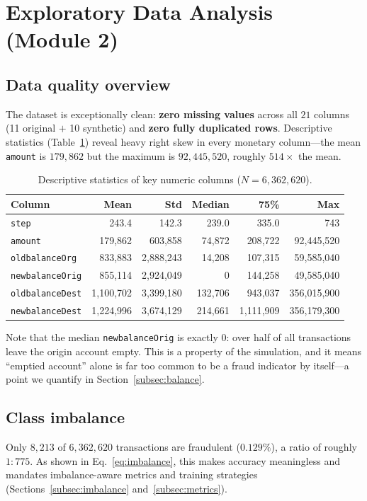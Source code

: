 \documentclass{article}
\begin{document}
\section{Exploratory Data Analysis (Module 2)}
\label{sec:eda}

\subsection{Data quality overview}
The dataset is exceptionally clean: \textbf{zero missing values} across
all $21$ columns (11 original $+$ 10 synthetic) and \textbf{zero fully
duplicated rows}. Descriptive statistics
(Table~\ref{tab:describe}) reveal heavy right skew in every monetary
column---the mean \texttt{amount} is $179{,}862$ but the maximum is
$92{,}445{,}520$, roughly $514\times$ the mean.

\begin{table}[H]
\centering
\caption{Descriptive statistics of key numeric columns
($N = 6{,}362{,}620$).}
\label{tab:describe}
\small
\begin{tabular}{lrrrrr}
\toprule
Column & Mean & Std & Median & 75\% & Max \\
\midrule
\texttt{step}           & 243.4     & 142.3     & 239.0     & 335.0       & 743 \\
\texttt{amount}         & 179{,}862 & 603{,}858 & 74{,}872  & 208{,}722   & 92{,}445{,}520 \\
\texttt{oldbalanceOrg}  & 833{,}883 & 2{,}888{,}243 & 14{,}208 & 107{,}315 & 59{,}585{,}040 \\
\texttt{newbalanceOrig} & 855{,}114 & 2{,}924{,}049 & 0         & 144{,}258 & 49{,}585{,}040 \\
\texttt{oldbalanceDest} & 1{,}100{,}702 & 3{,}399{,}180 & 132{,}706 & 943{,}037 & 356{,}015{,}900 \\
\texttt{newbalanceDest} & 1{,}224{,}996 & 3{,}674{,}129 & 214{,}661 & 1{,}111{,}909 & 356{,}179{,}300 \\
\bottomrule
\end{tabular}
\end{table}

Note that the median \texttt{newbalanceOrig} is exactly $0$: over half
of all transactions leave the origin account empty. This is a property
of the simulation, and it means ``emptied account'' alone is far too
common to be a fraud indicator by itself---a point we quantify in
Section~\ref{subsec:balance}.

\subsection{Class imbalance}
Only $8{,}213$ of $6{,}362{,}620$ transactions are fraudulent
($0.129\%$), a ratio of roughly $1{:}775$. As shown in
Eq.~\ref{eq:imbalance}, this makes accuracy meaningless and mandates
imbalance-aware metrics and training strategies
(Sections~\ref{subsec:imbalance} and~\ref{subsec:metrics}).
\end{document}
